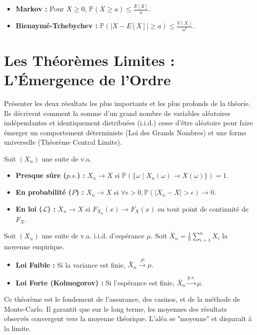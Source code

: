 \begin{proposition}
    \begin{itemize}
        \item \textbf{Markov :} Pour $X \ge 0$, $\mathbb{P}(X \ge a) \le \frac{E[X]}{a}$.
        \item \textbf{Bienaymé-Tchebychev :} $\mathbb{P}(|X-E[X]| \ge a) \le \frac{V(X)}{a^2}$.
    \end{itemize}
\end{proposition}

\section{Les Théorèmes Limites : L'Émergence de l'Ordre}

\begin{objectif}
    Présenter les deux résultats les plus importants et les plus profonds de la théorie. Ils décrivent comment la somme d'un grand nombre de variables aléatoires indépendantes et identiquement distribuées (i.i.d.) cesse d'être aléatoire pour faire émerger un comportement déterministe (Loi des Grands Nombres) et une forme universelle (Théorème Central Limite).
\end{objectif}

\begin{definition}
    Soit $(X_n)$ une suite de v.a.
    \begin{itemize}
        \item \textbf{Presque sûre ($p.s.$) :} $X_n \to X$ si $\mathbb{P}(\{\omega \mid X_n(\omega) \to X(\omega)\}) = 1$.
        \item \textbf{En probabilité ($P$) :} $X_n \to X$ si $\forall \epsilon>0, \mathbb{P}(|X_n-X|>\epsilon) \to 0$.
        \item \textbf{En loi ($\mathcal{L}$) :} $X_n \to X$ si $F_{X_n}(x) \to F_X(x)$ en tout point de continuité de $F_X$.
    \end{itemize}
\end{definition}

\begin{theorem}
    Soit $(X_n)$ une suite de v.a. i.i.d. d'espérance $\mu$. Soit $\bar{X}_n = \frac{1}{n}\sum_{i=1}^n X_i$ la moyenne empirique.
    \begin{itemize}
        \item \textbf{Loi Faible :} Si la variance est finie, $\bar{X}_n \xrightarrow{P} \mu$.
        \item \textbf{Loi Forte (Kolmogorov) :} Si l'espérance est finie, $\bar{X}_n \xrightarrow{p.s.} \mu$.
    \end{itemize}
\end{theorem}
\begin{remark}
    Ce théorème est le fondement de l'assurance, des casinos, et de la méthode de Monte-Carlo. Il garantit que sur le long terme, les moyennes des résultats observés convergent vers la moyenne théorique. L'aléa se "moyenne" et disparaît à la limite.
\end{remark}

